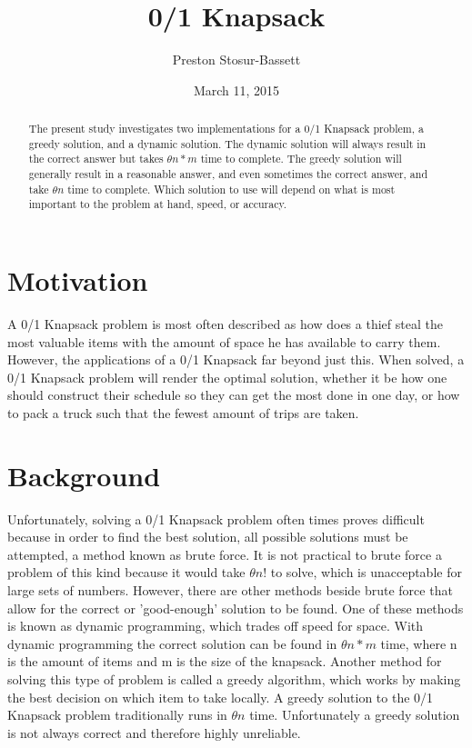 \documentclass[onecolumn, 12pt, article]{IEEEtran}
\numberwithin{case}{problem}
\numberwithin{condition}{problem}
\numberwithin{condition}{subsection}
\numberwithin{definition}{section}
\theoremstyle{remark}
\numberwithin{question}{problem}
\theoremstyle{plain}
\numberwithin{answer}{problem}
\numberwithin{solution}{section}
\numberwithin{equation}{section}%
\begin{document}
\title{0/1 Knapsack}
\author{Preston Stosur-Bassett}
\date{March 11, 2015}
\maketitle

\pagestyle{fancy}

\begin{abstract}
The present study investigates two implementations for a 0/1 Knapsack problem, a greedy solution, and a dynamic solution. The dynamic solution will always result in the correct answer but takes $\theta{n*m}$ time to complete. The greedy solution will generally result in a reasonable answer, and even sometimes the correct answer, and take $\theta{n}$ time to complete. Which solution to use will depend on what is most important to the problem at hand, speed, or accuracy.

\end{abstract}

\section{Motivation}
A 0/1 Knapsack problem is most often described as how does a thief steal the most valuable items with the amount of space he has available to carry them. However, the applications of a 0/1 Knapsack far beyond just this. When solved, a 0/1 Knapsack problem will render the optimal solution, whether it be how one should construct their schedule so they can get the most done in one day, or how to pack a truck such that the fewest amount of trips are taken. 


\section{Background}
Unfortunately, solving a 0/1 Knapsack problem often times proves difficult because in order to find the best solution, all possible solutions must be attempted, a method known as brute force. It is not practical to brute force a problem of this kind because it would take $ \theta{n!} $ to solve, which is unacceptable for large sets of numbers. However, there are other methods beside brute force that allow for the correct or 'good-enough' solution to be found. One of these methods is known as dynamic programming, which trades off speed for space. With dynamic programming the correct solution can be found in $ \theta{n*m} $ time, where n is the amount of items and m is the size of the knapsack. Another method for solving this type of problem is called a greedy algorithm, which works by making the best decision on which item to take locally. A greedy solution to the 0/1 Knapsack problem traditionally runs in $ \theta{n} $ time. Unfortunately a greedy solution is not always correct and therefore highly unreliable.
\end{document}
